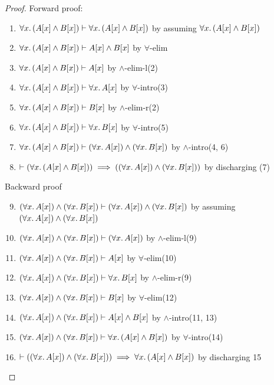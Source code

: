 \begin{proof}
Forward proof:
\begin{enumerate}
\item $\forall x\ldotp(A[x]\land B[x])\vdash\forall x\ldotp(A[x]\land B[x])$
  by assuming $\forall x\ldotp(A[x]\land B[x])$%
\item $\forall x\ldotp(A[x]\land B[x])\vdash A[x]\land B[x]$ by $\forall$-elim%
\item $\forall x\ldotp(A[x]\land B[x])\vdash A[x]$ by $\land$-elim-l(2)%
\item $\forall x\ldotp(A[x]\land B[x])\vdash\forall x\ldotp A[x]$ by $\forall$-intro(3)%
\item $\forall x\ldotp(A[x]\land B[x])\vdash B[x]$ by $\land$-elim-r(2)%
\item $\forall x\ldotp(A[x]\land B[x])\vdash\forall x\ldotp B[x]$ by $\forall$-intro(5)%
\item $\forall x\ldotp(A[x]\land B[x])\vdash(\forall x\ldotp A[x])\land(\forall x\ldotp B[x])$
  by $\land$-intro(4, 6)%
\item $\vdash(\forall x\ldotp(A[x]\land B[x]))\implies((\forall x\ldotp A[x])\land(\forall x\ldotp B[x]))$
  by discharging (7)%
\end{enumerate}
Backward proof
\begin{enumerate}\setcounter{enumi}{8}
\item $(\forall x\ldotp A[x])\land(\forall x\ldotp B[x])\vdash(\forall x\ldotp A[x])\land(\forall x\ldotp B[x])$
  by assuming $(\forall x\ldotp A[x])\land(\forall x\ldotp B[x])$%
\item $(\forall x\ldotp A[x])\land(\forall x\ldotp B[x])\vdash(\forall x\ldotp A[x])$
  by $\land$-elim-l(9)%
\item $(\forall x\ldotp A[x])\land(\forall x\ldotp B[x])\vdash A[x]$
  by $\forall$-elim(10)%
\item $(\forall x\ldotp A[x])\land(\forall x\ldotp B[x])\vdash\forall x\ldotp B[x]$
  by $\land$-elim-r(9)%
\item $(\forall x\ldotp A[x])\land(\forall x\ldotp B[x])\vdash B[x]$
  by $\forall$-elim(12)%
\item $(\forall x\ldotp A[x])\land(\forall x\ldotp B[x])\vdash
  A[x]\land B[x]$ by $\land$-intro(11, 13)%
\item $(\forall x\ldotp A[x])\land(\forall x\ldotp B[x])\vdash\forall
  x\ldotp(A[x]\land B[x])$ by $\forall$-intro(14)%
\item $\vdash((\forall x\ldotp A[x])\land(\forall x\ldotp B[x]))\implies\forall
  x\ldotp(A[x]\land B[x])$ by discharging 15\qedhere
\end{enumerate}
\end{proof}

